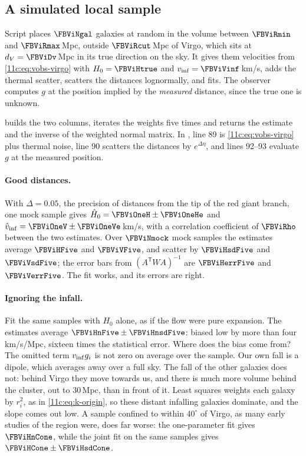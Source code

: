 \subsection{A simulated local sample}
\label{11c:sec:infall-sim}

Script  places $\FBViNgal$ galaxies at random
in the volume between $\FBViRmin$ and $\FBViRmax$\,Mpc, outside $\FBViRcut$\,Mpc of
Virgo, which sits at $d_V=\FBViDv$\,Mpc in its true direction on the sky. It gives
them velocities from \eqref{11c:eq:vobs-virgo} with $H_0=\FBViHtrue$ and
$v_{\rm inf}=\FBViVinf$\,km/s, adds the thermal scatter, scatters the distances
lognormally, and fits. The observer computes $g$ at the position implied by the
\emph{measured} distance, since the true one is unknown.


\noindent {} builds the two columns, iterates the weights five times and
returns the estimate and the inverse of the weighted normal matrix. In
, line 89 is \eqref{11c:eq:vobs-virgo} plus thermal noise, line 90 scatters
the distances by $e^{\Delta\eta}$, and lines 92--93 evaluate $g$ at the measured
position.

\paragraph{Good distances.} With $\Delta=0.05$, the precision of distances from the
tip of the red giant branch, one mock sample gives
$\hat H_0=\FBViOneH\pm\FBViOneHe$ and $\hat v_{\rm inf}=\FBViOneV\pm\FBViOneVe$\,km/s,
with a correlation coefficient of $\FBViRho$ between the two estimates. Over
$\FBViNmock$ mock samples the estimates average $\FBViHFive$ and $\FBViVFive$, and
scatter by $\FBViHsdFive$ and $\FBViVsdFive$; the error bars from
$(A^{\mathsf T}WA)^{-1}$ are $\FBViHerrFive$ and $\FBViVerrFive$. The fit works, and
its errors are right.

\paragraph{Ignoring the infall.} Fit the same samples with $H_0$ alone, as if the
flow were pure expansion. The estimates average $\FBViHnFive\pm\FBViHnsdFive$:
biased low by more than four km/s/Mpc, sixteen times the statistical error. Where
does the bias come from? The omitted term $v_{\rm inf}g_i$ is not zero on average
over the sample. Our own fall is a dipole, which averages away over a full sky.
The fall of the other galaxies does not: behind Virgo they move towards us, and
there is much more volume behind the cluster, out to $30$\,Mpc, than in front of it.
Least squares weights each galaxy by $r_i^2$, as in \eqref{11c:eq:k-origin}, so
these distant infalling galaxies dominate, and the slope comes out low. A sample
confined to within $40^\circ$ of Virgo, as many early studies of the region
were, does far worse: the one-parameter fit gives $\FBViHnCone$, while the joint fit
on the same samples gives $\FBViHCone\pm\FBViHsdCone$.

